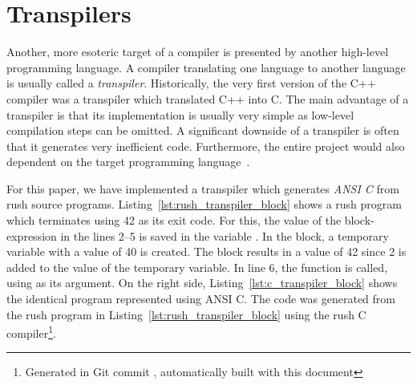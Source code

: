 \section{Transpilers}

Another, more esoteric target of a compiler is presented by another high-level programming language.
A compiler translating one language to another language is usually called a \emph{transpiler}.
Historically, the very first version of the C++ compiler was a transpiler which translated C++ into C.
The main advantage of a transpiler is that its implementation is usually very simple as low-level compilation steps can be omitted.
A significant downside of a transpiler is often that it generates very inefficient code.
Furthermore, the entire project would also dependent on the target programming language~\cite[p.~5]{Jeffery2021}.

For this paper, we have implemented a transpiler which generates \emph{ANSI C} from rush source programs.
Listing~\ref{lst:rush_transpiler_block} shows a rush program which terminates using 42 as its exit code.
For this, the value of the block-expression in the lines 2--5 is saved in the variable .
In the block, a temporary variable with a value of 40 is created.
The block results in a value of 42 since 2 is added to the value of the temporary variable.
In line 6, the  function is called, using  as its argument.
On the right side, Listing~\ref{lst:c_transpiler_block} shows the identical program represented using ANSI C.
The code was generated from the rush program in Listing~\ref{lst:rush_transpiler_block} using the rush C compiler\footnote{Generated in Git commit \rushCommit{}, automatically built with this document}.

\begin{minipage}{.34\textwidth}
	\center
\end{minipage}%
\hspace{3cm}%
\begin{minipage}{.45\textwidth}
	\center
\end{minipage}

